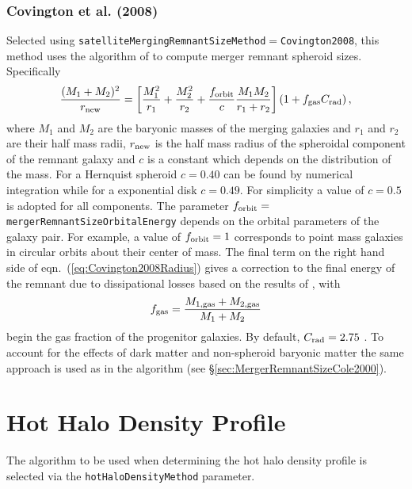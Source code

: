 \subsubsection{Covington et al. (2008)}

Selected using {\tt satelliteMergingRemnantSizeMethod}$=${\tt Covington2008}, this method uses the algorithm of \cite{covington_predicting_2008} to compute merger remnant spheroid sizes. Specifically
\begin{equation}
\frac{(M_1+M_2)^2}{ r_{\rm new}} =
\left[ \frac{M_1^2}{r_1} + \frac{M_2^2}{r_2} + \frac{ f_{\rm orbit}}{c}
\frac{M_1 M_2}{r_1+r_2}\right] \left( 1 + f_{\rm gas} C_{\rm rad} \right),
\label{eq:Covington2008Radius}
\end{equation}
where $M_1$ and $M_2$ are the baryonic masses of the merging galaxies and $r_1$
and $r_2$ are their half mass radii, $r_{\rm new}$ is the half mass radius of the spheroidal component of the remnant galaxy and $c$ is a constant which depends on the distribution of the mass. For a Hernquist spheroid $c=0.40$ can be found by numerical integration while for a exponential disk $c=0.49$. For simplicity a value of $c=0.5$ is adopted for all components. The parameter $f_{\rm orbit}=${\tt mergerRemnantSizeOrbitalEnergy} depends on the orbital parameters of the galaxy pair. For example, a value of $f_{\rm orbit} = 1$ corresponds to point mass galaxies in circular orbits about their center of mass. The final term on the right hand side of eqn.~(\ref{eq:Covington2008Radius}) gives a correction to the final energy of the remnant due to dissipational losses based on the results of \cite{covington_effects_2011}, with
\begin{equation}
 f_{\rm gas} = {M_{\rm 1,gas}+M_{\rm 2,gas} \over M_1+M_2}
\end{equation}
begin the gas fraction of the progenitor galaxies. By default, $C_{\rm rad}=2.75$ \citep{covington_effects_2011}. To account for the effects of dark matter and non-spheroid baryonic matter the same approach is used as in the \cite{cole_hierarchical_2000} algorithm (see \S\ref{sec:MergerRemnantSizeCole2000}). 

\section{Hot Halo Density Profile}

The algorithm to be used when determining the hot halo density profile is selected via the {\tt hotHaloDensityMethod} parameter.

